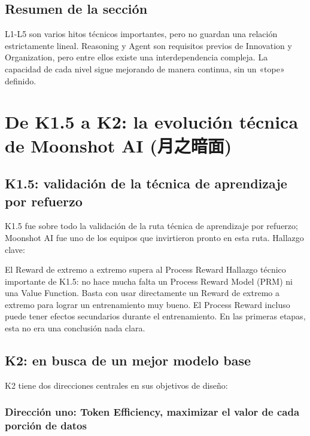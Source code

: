 \documentclass[a4paper]{article}
\begin{document}
\subsection{Resumen de la sección}

L1-L5 son varios hitos técnicos importantes, pero no guardan una relación estrictamente lineal. Reasoning y Agent son requisitos previos de Innovation y Organization, pero entre ellos existe una interdependencia compleja. La capacidad de cada nivel sigue mejorando de manera continua, sin un «tope» definido.
\section{De K1.5 a K2: la evolución técnica de Moonshot AI (月之暗面)}

\subsection{K1.5: validación de la técnica de aprendizaje por refuerzo}

K1.5 fue sobre todo la validación de la ruta técnica de aprendizaje por refuerzo; Moonshot AI fue uno de los equipos que invirtieron pronto en esta ruta. Hallazgo clave:

\begin{importantbox}{El Reward de extremo a extremo supera al Process Reward}
Hallazgo técnico importante de K1.5: no hace mucha falta un Process Reward Model (PRM) ni una Value Function. Basta con usar directamente un Reward de extremo a extremo para lograr un entrenamiento muy bueno. El Process Reward incluso puede tener efectos secundarios durante el entrenamiento. En las primeras etapas, esta no era una conclusión nada clara.
\end{importantbox}

\subsection{K2: en busca de un mejor modelo base}

K2 tiene dos direcciones centrales en sus objetivos de diseño:

\subsubsection{Dirección uno: Token Efficiency, maximizar el valor de cada porción de datos}
\end{document}
